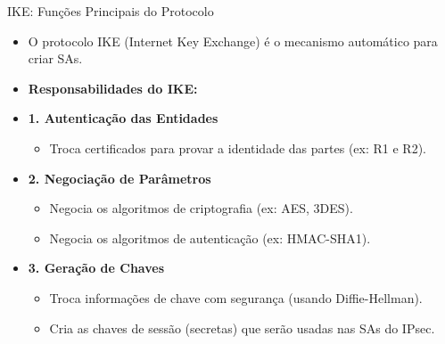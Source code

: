 \begin{frame}{IKE: Funções Principais do Protocolo}
    \begin{itemize}
        \item O protocolo IKE (Internet Key Exchange) é o mecanismo automático para criar SAs.
        \item \textbf{Responsabilidades do IKE:}

        \item \textbf{1. Autenticação das Entidades}
              \begin{itemize}
                  \item Troca certificados para provar a identidade das partes (ex: R1 e R2).
              \end{itemize}

        \item \textbf{2. Negociação de Parâmetros}
              \begin{itemize}
                  \item Negocia os algoritmos de criptografia (ex: AES, 3DES).
                  \item Negocia os algoritmos de autenticação (ex: HMAC-SHA1).
              \end{itemize}

        \item \textbf{3. Geração de Chaves}
              \begin{itemize}
                  \item Troca informações de chave com segurança (usando Diffie-Hellman).
                  \item Cria as chaves de sessão (secretas) que serão usadas nas SAs do IPsec.
              \end{itemize}
    \end{itemize}
\end{frame}


